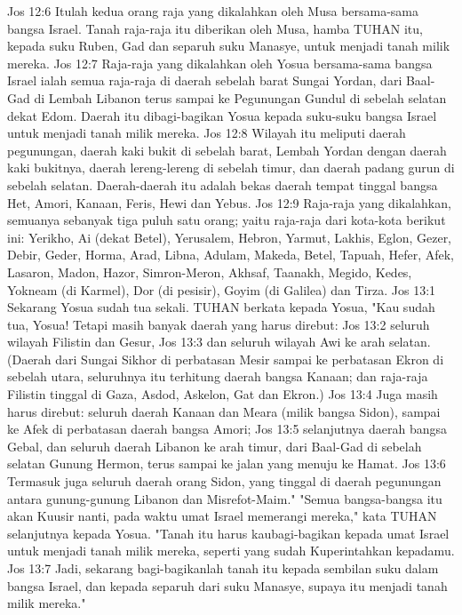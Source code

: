 Jos 12:6  Itulah kedua orang raja yang dikalahkan oleh Musa bersama-sama bangsa Israel. Tanah raja-raja itu diberikan oleh Musa, hamba TUHAN itu, kepada suku Ruben, Gad dan separuh suku Manasye, untuk menjadi tanah milik mereka.
Jos 12:7  Raja-raja yang dikalahkan oleh Yosua bersama-sama bangsa Israel ialah semua raja-raja di daerah sebelah barat Sungai Yordan, dari Baal-Gad di Lembah Libanon terus sampai ke Pegunungan Gundul di sebelah selatan dekat Edom. Daerah itu dibagi-bagikan Yosua kepada suku-suku bangsa Israel untuk menjadi tanah milik mereka.
Jos 12:8  Wilayah itu meliputi daerah pegunungan, daerah kaki bukit di sebelah barat, Lembah Yordan dengan daerah kaki bukitnya, daerah lereng-lereng di sebelah timur, dan daerah padang gurun di sebelah selatan. Daerah-daerah itu adalah bekas daerah tempat tinggal bangsa Het, Amori, Kanaan, Feris, Hewi dan Yebus.
Jos 12:9  Raja-raja yang dikalahkan, semuanya sebanyak tiga puluh satu orang; yaitu raja-raja dari kota-kota berikut ini: Yerikho, Ai (dekat Betel), Yerusalem, Hebron, Yarmut, Lakhis, Eglon, Gezer, Debir, Geder, Horma, Arad, Libna, Adulam, Makeda, Betel, Tapuah, Hefer, Afek, Lasaron, Madon, Hazor, Simron-Meron, Akhsaf, Taanakh, Megido, Kedes, Yokneam (di Karmel), Dor (di pesisir), Goyim (di Galilea) dan Tirza.
Jos 13:1  Sekarang Yosua sudah tua sekali. TUHAN berkata kepada Yosua, "Kau sudah tua, Yosua! Tetapi masih banyak daerah yang harus direbut:
Jos 13:2  seluruh wilayah Filistin dan Gesur,
Jos 13:3  dan seluruh wilayah Awi ke arah selatan. (Daerah dari Sungai Sikhor di perbatasan Mesir sampai ke perbatasan Ekron di sebelah utara, seluruhnya itu terhitung daerah bangsa Kanaan; dan raja-raja Filistin tinggal di Gaza, Asdod, Askelon, Gat dan Ekron.)
Jos 13:4  Juga masih harus direbut: seluruh daerah Kanaan dan Meara (milik bangsa Sidon), sampai ke Afek di perbatasan daerah bangsa Amori;
Jos 13:5  selanjutnya daerah bangsa Gebal, dan seluruh daerah Libanon ke arah timur, dari Baal-Gad di sebelah selatan Gunung Hermon, terus sampai ke jalan yang menuju ke Hamat.
Jos 13:6  Termasuk juga seluruh daerah orang Sidon, yang tinggal di daerah pegunungan antara gunung-gunung Libanon dan Misrefot-Maim." "Semua bangsa-bangsa itu akan Kuusir nanti, pada waktu umat Israel memerangi mereka," kata TUHAN selanjutnya kepada Yosua. "Tanah itu harus kaubagi-bagikan kepada umat Israel untuk menjadi tanah milik mereka, seperti yang sudah Kuperintahkan kepadamu.
Jos 13:7  Jadi, sekarang bagi-bagikanlah tanah itu kepada sembilan suku dalam bangsa Israel, dan kepada separuh dari suku Manasye, supaya itu menjadi tanah milik mereka."
